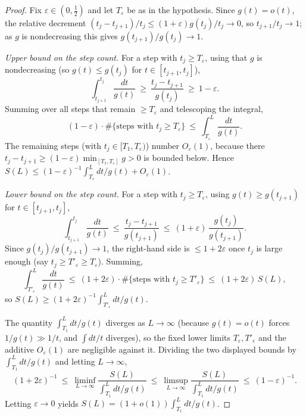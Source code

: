 \documentclass[12pt]{article}
\theoremstyle{definition}
\begin{document}
\begin{proof}
Fix $\varepsilon\in(0,\tfrac12)$ and let $T_\varepsilon$ be as in the hypothesis.
Since $g(t)=o(t)$, the relative decrement $(t_j-t_{j+1})/t_j\le(1+\varepsilon)g(t_j)/t_j\to0$,
so $t_{j+1}/t_j\to1$; as $g$ is nondecreasing this gives $g(t_{j+1})/g(t_j)\to1$.

\emph{Upper bound on the step count.} For a step with $t_j\ge T_\varepsilon$, using
that $g$ is nondecreasing (so $g(t)\le g(t_j)$ for $t\in[t_{j+1},t_j]$),
\[
  \int_{t_{j+1}}^{t_j}\frac{dt}{g(t)}\ \ge\ \frac{t_j-t_{j+1}}{g(t_j)}
  \ \ge\ 1-\varepsilon .
\]
Summing over all steps that remain $\ge T_\varepsilon$ and telescoping the integral,
\[
  (1-\varepsilon)\cdot\#\{\text{steps with }t_j\ge T_\varepsilon\}\ \le\
  \int_{T_\varepsilon}^{L}\frac{dt}{g(t)} .
\]
The remaining steps (with $t_j\in[T_1,T_\varepsilon)$) number $O_\varepsilon(1)$,
because there $t_j-t_{j+1}\ge(1-\varepsilon)\min_{[T_1,T_\varepsilon]}g>0$ is bounded
below. Hence $S(L)\le(1-\varepsilon)^{-1}\int_{T_\varepsilon}^{L}dt/g(t)+O_\varepsilon(1)$.

\emph{Lower bound on the step count.} For a step with $t_j\ge T_\varepsilon$, using
$g(t)\ge g(t_{j+1})$ for $t\in[t_{j+1},t_j]$,
\[
  \int_{t_{j+1}}^{t_j}\frac{dt}{g(t)}\ \le\ \frac{t_j-t_{j+1}}{g(t_{j+1})}
  \ \le\ (1+\varepsilon)\,\frac{g(t_j)}{g(t_{j+1})} .
\]
Since $g(t_j)/g(t_{j+1})\to1$, the right-hand side is $\le1+2\varepsilon$ once $t_j$
is large enough (say $t_j\ge T'_\varepsilon\ge T_\varepsilon$). Summing,
\[
  \int_{T'_\varepsilon}^{L}\frac{dt}{g(t)}\ \le\ (1+2\varepsilon)\cdot
  \#\{\text{steps with }t_j\ge T'_\varepsilon\}\ \le\ (1+2\varepsilon)\,S(L),
\]
so $S(L)\ge(1+2\varepsilon)^{-1}\int_{T'_\varepsilon}^{L}dt/g(t)$.

The quantity $\int_{T_1}^{L}dt/g(t)$ diverges as $L\to\infty$ (because $g(t)=o(t)$
forces $1/g(t)\gg1/t$, and $\int dt/t$ diverges), so the fixed lower limits
$T_\varepsilon,T'_\varepsilon$ and the additive $O_\varepsilon(1)$ are negligible
against it. Dividing the two displayed bounds by $\int_{T_1}^{L}dt/g(t)$ and letting
$L\to\infty$,
\[
  (1+2\varepsilon)^{-1}\ \le\ \liminf_{L\to\infty}\frac{S(L)}{\int_{T_1}^{L}dt/g(t)}
  \ \le\ \limsup_{L\to\infty}\frac{S(L)}{\int_{T_1}^{L}dt/g(t)}\ \le\ (1-\varepsilon)^{-1}.
\]
Letting $\varepsilon\to0$ yields $S(L)=(1+o(1))\int_{T_1}^{L}dt/g(t)$.
\end{proof}
\end{document}
